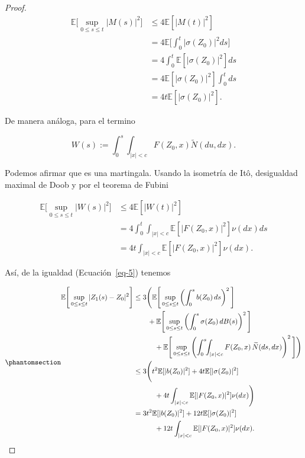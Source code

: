\documentclass[
  spanish,
  us-letterpaper,
]{scrreprt}
\theoremstyle{plain}
\theoremstyle{plain}
\theoremstyle{definition}
\theoremstyle{plain}
\theoremstyle{remark}
\begin{document}
\begin{proof}
\[
    \begin{aligned}
        \mathbb{E}\Bigg[\sup\limits_{0\leq s\leq t}|M(s)|^2\Bigg] & \leq 4\mathbb{E}[|M(t)|^2]\\ 
        & = 4 \mathbb{E}\Bigg[\int_0^t |\sigma(Z_0)|^2ds\Bigg]\\ 
        & = 4 \int_0^t \mathbb{E}[|\sigma(Z_0)|^2]ds\\ 
        & = 4 \mathbb{E}[|\sigma(Z_0)|^2]\int_0^t ds\\ 
        & = 4t \mathbb{E}[|\sigma(Z_0)|^2].
    \end{aligned}
\]

De manera análoga, para el termino

\[
    W(s):= \int_0^s\int_{|x|<c}F(Z_0,x)\widetilde{N}(du,dx).
\]

Podemos afirmar que es una martingala. Usando la isometría de Itô,
desigualdad maximal de Doob y por el teorema de Fubini

\[
    \begin{aligned}
        \mathbb{E}\Bigg[\sup\limits_{0\leq s\leq t}|W(s)|^2\Bigg] & \leq 4\mathbb{E}[|W(t)|^2]\\ 
        & = 4\int_0^t\int_{|x|<c}\mathbb{E}[|F(Z_0,x)|^2]\nu(dx)ds\\ 
        & = 4t\int_{|x|<c}\mathbb{E}[|F(Z_0,x)|^2]\nu(dx).
    \end{aligned}
\]

Así, de la igualdad (Ecuación~\ref{eq-5}) tenemos

\begin{equation}\phantomsection\label{eq-7}{
    \begin{aligned}
        \mathbb{E}\Bigg[\sup\limits_{0\leq s\leq t}|Z_1(s)-Z_0|^2\Bigg] 
        & \leq 3\Bigg( \mathbb{E}\Bigg[\sup\limits_{0\leq s\leq t}\left(\int_0^s b(Z_0)\,ds\right)^2\Bigg]\\ 
            &\qquad
               + \mathbb{E}\Bigg[\sup\limits_{0\leq s\leq t} \left(\int_0^s \sigma(Z_0)\,dB(s)\right)^2\Bigg]\\
        &\qquad\quad
            +\mathbb{E}\Bigg[\sup\limits_{0\leq s\leq t} \left(\int_0^s\!\!\int_{|x|<c} F(Z_0,x)\,\widetilde{N}(ds,dx)\right)^2\Bigg]\Bigg)\\
        & \leq 3\Bigg(t^2\mathbb{E}[|b(Z_0)|^2]+4t\mathbb{E}[|\sigma(Z_0)|^2]\\ 
        & \qquad\quad + 4t\int_{|x|<c}\mathbb{E}[|F(Z_0,x)|^2]\nu(dx)\Bigg)\\ 
        & = 3t^2\mathbb{E}[|b(Z_0)|^2]+12t\mathbb{E}[|\sigma(Z_0)|^2]\\ 
        & \qquad\quad +12t\int_{|x|<c}\mathbb{E}[|F(Z_0,x)|^2]\nu(dx).
    \end{aligned}
}\end{equation}


\end{proof}
\end{document}
